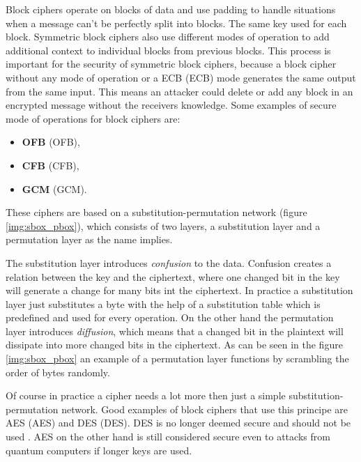 Block ciphers operate on blocks of data and use padding to handle situations when a message can't be perfectly split into blocks. The same key used for each block. Symmetric block ciphers also use different modes of operation to add additional context to individual blocks from previous blocks. This process is important for the security of symmetric block ciphers, because a block cipher without any mode of operation or a ECB (\acl{ECB}) mode generates the same output from the same input. This means an attacker could delete or add any block in an encrypted message without the receivers knowledge. Some examples of secure mode of operations for block ciphers are:
\begin{itemize}
  \item \textbf{OFB} (\acl{OFB}),
  \item \textbf{CFB} (\acl{CFB}),
  \item \textbf{GCM} (\acl{GCM}).
\end{itemize}

These ciphers are based on a substitution-permutation network (figure \ref{img:sbox_pbox}), which consists of two layers, a substitution layer and a permutation layer as the name implies. 

The substitution layer introduces \textit{confusion} to the data. Confusion creates a relation between the key and the ciphertext, where one changed bit in the key will generate a change for many bits int the ciphertext. In practice a substitution layer just substitutes a byte with the help of a substitution table which is predefined and used for every operation. On the other hand the permutation layer introduces \textit{diffusion}, which means that a changed bit in the plaintext will dissipate into more changed bits in the ciphertext. As can be seen in the figure \ref{img:sbox_pbox} an example of a permutation layer functions by scrambling the order of bytes randomly. \cite{Paar2010}\cite{Shannon1949}

Of course in practice a cipher needs a lot more then just a simple substitution-permutation network. Good examples of block ciphers that use this principe are AES (\acl{AES}) and DES (\acl{DES}). DES is no longer deemed secure and should not be used \cite{Barker2017}. AES on the other hand is still considered secure even to attacks from quantum computers if longer keys are used\cite{Chen2016}.

